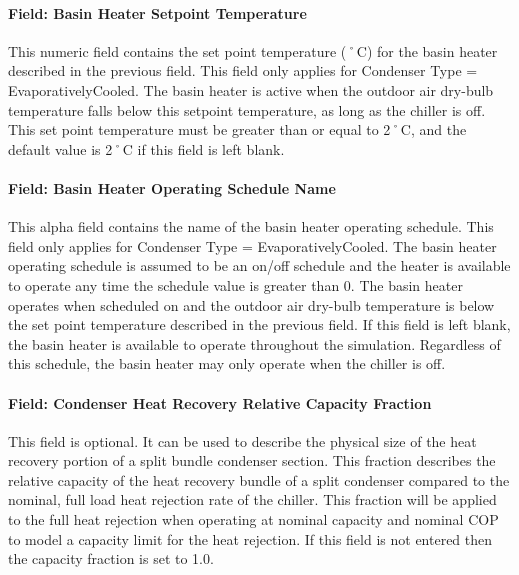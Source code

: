 \paragraph{Field: Basin Heater Setpoint Temperature}\label{field-basin-heater-setpoint-temperature-3-001}

This numeric field contains the set point temperature (˚C) for the basin heater described in the previous field. This field only applies for Condenser Type = EvaporativelyCooled. The basin heater is active when the outdoor air dry-bulb temperature falls below this setpoint temperature, as long as the chiller is off. This set point temperature must be greater than or equal to 2˚C, and the default value is 2˚C if this field is left blank.

\paragraph{Field: Basin Heater Operating Schedule Name}\label{field-basin-heater-operating-schedule-name-3-001}

This alpha field contains the name of the basin heater operating schedule. This field only applies for Condenser Type = EvaporativelyCooled. The basin heater operating schedule is assumed to be an on/off schedule and the heater is available to operate any time the schedule value is greater than 0. The basin heater operates when scheduled on and the outdoor air dry-bulb temperature is below the set point temperature described in the previous field. If this field is left blank, the basin heater is available to operate throughout the simulation. Regardless of this schedule, the basin heater may only operate when the chiller is off.

\paragraph{Field: Condenser Heat Recovery Relative Capacity Fraction}\label{field-engine-heat-recovery-fraction}

This field is optional. It can be used to describe the physical size of the heat recovery portion of a split bundle condenser section. This fraction describes the relative capacity of the heat recovery bundle of a split condenser compared to the nominal, full load heat rejection rate of the chiller. This fraction will be applied to the full heat rejection when operating at nominal capacity and nominal COP to model a capacity limit for the heat rejection. If this field is not entered then the capacity fraction is set to 1.0.

